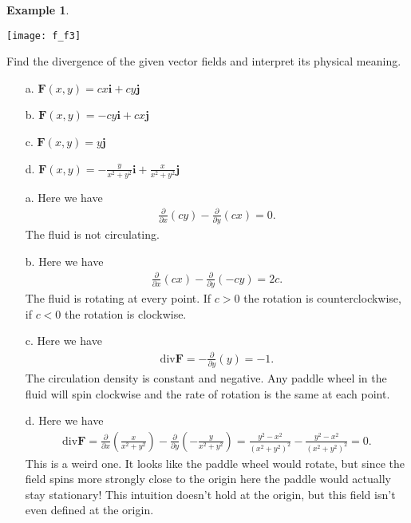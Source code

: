 \documentclass[12pt, letter]{article}
\theoremstyle{plain}
\numberwithin{theorem}{section}
\theoremstyle{definition}
\newtheorem{example}[theorem]{Example}
\begin{document}
\begin{example}

\bigskip

\begin{center}
\texttt{[image: f\_f3]}
\end{center}

\bigskip

Find the divergence of the given vector fields and interpret its physical meaning.
\begin{itemize}
\item[a.] $\bm{F}(x,y) = cx\bm{i}+cy\bm{j}$
\item[b.] $\bm{F}(x,y) = -cy\bm{i}+cx\bm{j}$
\item[c.] $\bm{F}(x,y) = y\bm{j}$
\item[d.] $\bm{F}(x,y) = -\frac{y}{x^2+y^2}\bm{i}+\frac{x}{x^2+y^2}\bm{j}$
\end{itemize}

\hrulefill

\begin{itemize}
\item[a.] Here we have
\begin{align*}
\frac{\partial}{\partial x} (cy)-\frac{\partial}{\partial y}(cx) = 0.
\end{align*}
The fluid is not circulating.
\item[b.] Here we have
\begin{align*}
\frac{\partial}{\partial x} (cx)-\frac{\partial}{\partial y}(-cy) =2c.
\end{align*}
The fluid is rotating at every point. If $c>0$ the rotation is counterclockwise, if $c<0$ the rotation is clockwise.
\item[c.] Here we have
\begin{align*}
\text{div} \bm{F} = -\frac{\partial}{\partial y} (y)=-1.
\end{align*}
The circulation density is constant and negative. Any paddle wheel in the fluid will spin clockwise and the rate of rotation is the same at each point.
\item[d.] Here we have
\begin{align*}
\text{div} \bm{F} = \frac{\partial}{\partial x} \left(\frac{x}{x^2+y^2}\right)-\frac{\partial}{\partial y}\left(-\frac{y}{x^2+y^2}\right) = \frac{y^2-x^2}{(x^2+y^2)^2}-\frac{y^2-x^2}{(x^2+y^2)^2}=0.
\end{align*}
This is a weird one. It looks like the paddle wheel would rotate, but since the field spins more strongly close to the origin here the paddle would actually stay stationary! This intuition doesn't hold at the origin, but this field isn't even defined at the origin.
\end{itemize}
\end{example}
\end{document}
